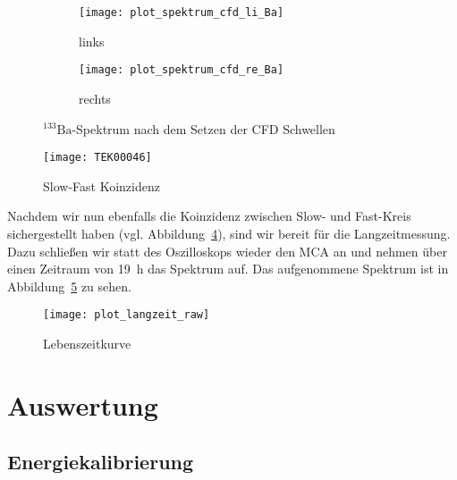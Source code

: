 \documentclass[11pt, ngerman, fleqn, DIV=15, headinclude, BCOR=2cm]{scrreprt}
\newcommand{\plotwidth}{0.8\linewidth}
\begin{document}
\begin{figure}
	\centering
	\begin{subfigure}{0.49 \textwidth}
		\texttt{[image: plot\_spektrum\_cfd\_li\_Ba]}
		\caption{%
			links
		}
		\label{fig:ba_fast_signal_cfd_plot-li}
	\end{subfigure}
	\begin{subfigure}{0.49 \textwidth}
		\texttt{[image: plot\_spektrum\_cfd\_re\_Ba]}
		\caption{%
			rechts
		}
		\label{fig:ba_fast_signal_cfd_plot-re}
	\end{subfigure}
	\caption{%
		$^{133}\text{Ba}$-Spektrum nach dem Setzen der CFD Schwellen
	}
	\label{fig:ba_fast_signal_cfd_plot}
\end{figure}

\begin{figure}
	\centering
	\texttt{[image: TEK00046]}
	\caption{%
		Slow-Fast Koinzidenz
	}
	\label{fig:ba_slow_fast_koinzidenz}
\end{figure}

Nachdem wir nun ebenfalls die Koinzidenz zwischen Slow- und Fast-Kreis
sichergestellt haben (vgl. Abbildung~\ref{fig:ba_slow_fast_koinzidenz}), sind
wir bereit für die Langzeitmessung. Dazu schließen wir statt des Oszilloskops
wieder den MCA an und nehmen über einen Zeitraum von \SI{19}{\hour} das
Spektrum auf. Das aufgenommene Spektrum ist in
Abbildung~\ref{fig:langzeit_plot} zu sehen.

\begin{figure}
	\centering
	\texttt{[image: plot\_langzeit\_raw]}
	\caption{%
		Lebenszeitkurve
	}
	\label{fig:langzeit_plot}
\end{figure}

\clearpage
\chapter{Auswertung}
\section{Energiekalibrierung}
\end{document}
